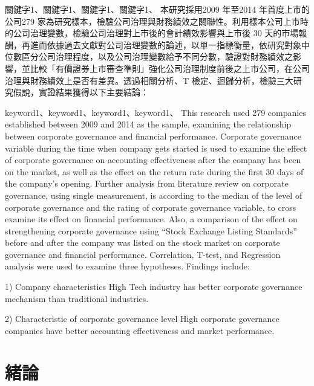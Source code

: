 \documentclass[
    writingLanguage=chinese,
    addPageTitle=on,
    addDeclaration=on,
    addMUSTlog=off,
    printing=off,
    refIndent=on,
    addFigTOC=on,
    addTabTOC=on,
]{.def/must}
\begin{document}
\begin{abstract@cn}{關鍵字1、關鍵字1、關鍵字1、關鍵字1、}
本研究採用2009 年至2014 年首度上市的公司279 家為研究樣本，檢驗公司治理與財務績效之關聯性。利用樣本公司上市時的公司治理變數，檢驗公司治理對上市後的會計績效影響與上市後 30 天的市場報酬，再進而依據過去文獻對公司治理變數的論述，以單一指標衡量，依研究對象中位數區分公司治理程度，以及公司治理變數給予不同分數，驗證對財務績效之影響，並比較「有價證券上市審查準則」強化公司治理制度前後之上市公司，在公司治理與財務績效上是否有差異。透過相關分析、T 檢定、迴歸分析，檢驗三大研究假說，實證結果獲得以下主要結論： 

\end{abstract@cn}

\begin{abstract@en}{keyword1、keyword1、keyword1、keyword1、}
This research used 279 companies established between 2009 and 2014 as the
sample, examining the relationship between corporate governance and financial
performance. Corporate governance variable during the time when company
gets started is used to examine the effect of corporate governance on accounting
effectiveness after the company has been on the market, as well as the effect on
the return rate during the first 30 days of the company’s opening. Further
analysis from literature review on corporate governance, using single
measurement, is according to the median of the level of corporate governance
and the rating of corporate governance variable, to cross examine its effect on
financial performance. Also, a comparison of the effect on strengthening
corporate governance using “Stock Exchange Listing Standards” before and
after the company was listed on the stock market on corporate governance and
financial performance. Correlation, T-test, and Regression analysis were used to
examine three hypotheses. Findings include:

1) Company characteristics
High Tech industry has better corporate governance mechanism than traditional
industries.

2) Characteristic of corporate governance level
High corporate governance companies have better accounting effectiveness and
market performance.
\end{abstract@en}

\addtableofcontents

\chapter{緒論}
\end{document}
